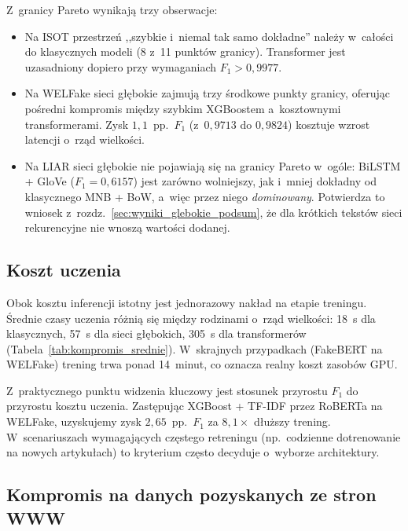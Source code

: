 \documentclass[oneside,polski,logo]{amuthesis}
\begin{document}
Z~granicy Pareto wynikają trzy obserwacje:

\begin{itemize}
  \item Na ISOT przestrzeń ,,szybkie i~niemal tak samo dokładne''
        należy w~całości do klasycznych modeli (8 z~11 punktów
        granicy). Transformer jest uzasadniony dopiero przy
        wymaganiach $F_1 > 0{,}9977$.
  \item Na WELFake sieci głębokie zajmują trzy środkowe punkty granicy,
        oferując pośredni kompromis między szybkim XGBoostem
        a~kosztownymi transformerami. Zysk \(1{,}1\)~pp.\ $F_1$
        (z~\(0{,}9713\) do \(0{,}9824\)) kosztuje wzrost latencji
        o~rząd wielkości.
  \item Na LIAR sieci głębokie nie pojawiają się na granicy Pareto
        w~ogóle: BiLSTM + GloVe (\(F_1 = 0{,}6157\)) jest zarówno
        wolniejszy, jak i~mniej dokładny od klasycznego MNB + BoW,
        a~więc przez niego \emph{dominowany}. Potwierdza to wniosek
        z~rozdz.~\ref{sec:wyniki_glebokie_podsum}, że dla krótkich
        tekstów sieci rekurencyjne nie wnoszą wartości dodanej.
\end{itemize}

\subsection{Koszt uczenia}
\label{sec:kompromis_train}

Obok kosztu inferencji istotny jest jednorazowy nakład na etapie
treningu. Średnie czasy uczenia różnią się między rodzinami o~rząd
wielkości: 18~s dla klasycznych, 57~s dla sieci głębokich,
305~s dla transformerów (Tabela~\ref{tab:kompromis_srednie}).
W~skrajnych przypadkach (FakeBERT na WELFake) trening trwa ponad
14~minut, co oznacza realny koszt zasobów GPU.

Z~praktycznego punktu widzenia kluczowy jest stosunek przyrostu $F_1$
do przyrostu kosztu uczenia. Zastępując XGBoost + TF-IDF przez RoBERTa
na WELFake, uzyskujemy zysk \(2{,}65\)~pp.\ $F_1$ za \(8{,}1\times\)
dłuższy trening. W~scenariuszach wymagających częstego retreningu
(np.\ codzienne dotrenowanie na nowych artykułach) to kryterium
często decyduje o~wyborze architektury.

\subsection{Kompromis na danych pozyskanych ze stron WWW}
\label{sec:kompromis_web}
\end{document}
